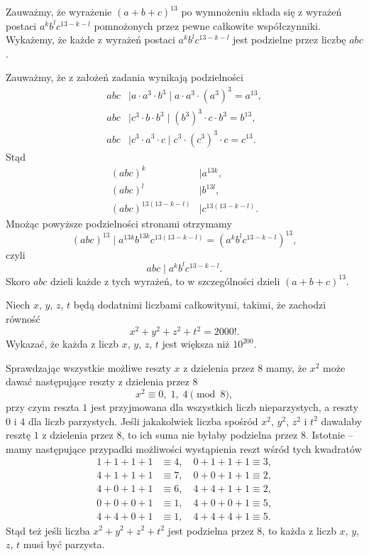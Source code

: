 \vspace{10px}
\noindent
Zauważmy, że wyrażenie $(a + b + c)^{13}$ po wymnożeniu składa się z wyrażeń postaci $a^kb^lc^{13 - k - l}$ pomnożonych przez pewne całkowite współczynniki. Wykażemy, że każde z wyrażeń postaci $a^kb^lc^{13 - k - l}$ jest podzielne przez liczbę $abc$. 


\vspace{10px}
\noindent
Zauważmy, że z założeń zadania wynikają podzielności
\begin{align*}
	abc &\mid a \cdot a^3 \cdot b^3 \mid a \cdot a^3 \cdot (a^3)^3 = a^{13}, \\
	abc &\mid c^3 \cdot b \cdot b^3 \mid (b^3)^3 \cdot c \cdot b^3 = b^{13}, \\
	abc &\mid c^3 \cdot a^3 \cdot c \mid c^3 \cdot (c^3)^3 \cdot c = c^{13}.
\end{align*}
Stąd
\begin{align*}
	(abc)^k &\mid  a^{13k}, \\
	(abc)^l &\mid  b^{13l}, \\
	(abc)^{13(13 - k - l)} &\mid  c^{13(13 - k - l)}.
\end{align*}
Mnożąc powyższe podzielności stronami otrzymamy
\[
	(abc)^{13} \mid a^{13k}b^{13k}c^{13(13 - k - l)} = (a^kb^lc^{13 - k - l})^{13},
\]
czyli
\[
	abc \mid a^kb^lc^{13 - k - l}.
\]
Skoro $abc$ dzieli każde z tych wyrażeń, to w szczególności dzieli $(a + b + c)^{13}$.

\vspace{5px}

\begin{problem}{4}
	Niech $x$, $y$, $z$, $t$ będą dodatnimi liczbami całkowitymi, takimi, że zachodzi równość
	\[
		x^2 + y^2 + z^2 + t^2 = 2000!.
	\]
	Wykazać, że każda z liczb $x$, $y$, $z$, $t$ jest większa niż $10^{200}$.
\end{problem}

\noindent
Sprawdzając wszystkie możliwe reszty $x$ z dzielenia przez $8$ mamy, że $x^2$ może dawać następujące reszty z dzielenia przez 8
\[
	x^2 \equiv 0, \; 1, \; 4 \pmod{8},
\]
przy czym reszta $1$ jest przyjmowana dla wszystkich liczb nieparzystych, a reszty $0$ i $4$ dla liczb parzystych. Jeśli jakakolwiek liczba spośród $x^2$, $y^2$, $z^2$ i $t^2$ dawałaby resztę $1$ z dzielenia przez $8$, to ich suma nie byłaby podzielna przez $8$. Istotnie -- mamy następujące przypadki możliwości wystąpienia reszt wśród tych kwadratów
\begin{align*}
	1 + 1 + 1 + 1 & \equiv 4, \quad
	0 + 1 + 1 + 1  \equiv 3, \\
	4 + 1 + 1 + 1 & \equiv 7, \quad
	0 + 0 + 1 + 1  \equiv 2, \\
	4 + 0 + 1 + 1 & \equiv 6, \quad
	4 + 4 + 1 + 1  \equiv 2, \\
	0 + 0 + 0 + 1 & \equiv 1, \quad
	4 + 0 + 0 + 1  \equiv 5, \\
	4 + 4 + 0 + 1 & \equiv 1, \quad
	4 + 4 + 4 + 1  \equiv 5. 
\end{align*}
Stąd też jeśli liczba $x^2 + y^2 + z^2 + t^2$ jest podzielna przez $8$, to każda z liczb $x$, $y$, $z$, $t$ musi być parzysta.


